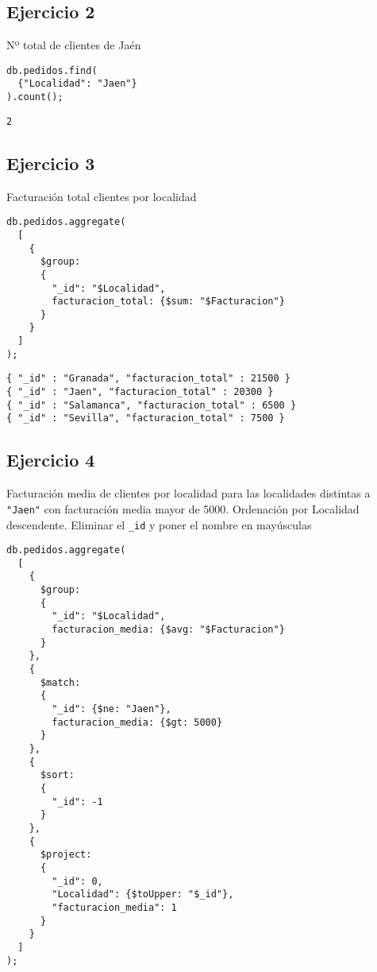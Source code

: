 \subsection{Ejercicio 2}

Nº total de clientes de Jaén

\begin{lstlisting}
db.pedidos.find(
  {"Localidad": "Jaen"}
).count();
\end{lstlisting}

\begin{lstlisting}
2
\end{lstlisting}

\subsection{Ejercicio 3}

Facturación total clientes por localidad

\begin{lstlisting}
db.pedidos.aggregate(
  [
    {
      $group: 
      {
        "_id": "$Localidad", 
        facturacion_total: {$sum: "$Facturacion"}
      }
    }
  ]
);
\end{lstlisting}

\begin{lstlisting}
{ "_id" : "Granada", "facturacion_total" : 21500 }
{ "_id" : "Jaen", "facturacion_total" : 20300 }
{ "_id" : "Salamanca", "facturacion_total" : 6500 }
{ "_id" : "Sevilla", "facturacion_total" : 7500 }
\end{lstlisting}

\subsection{Ejercicio 4}

Facturación media de clientes por localidad para las localidades distintas a \texttt{"Jaen"} con facturación media mayor de 5000. Ordenación por Localidad descendente. Eliminar el \texttt{\_id} y poner el nombre en mayúsculas

\begin{lstlisting}
db.pedidos.aggregate(
  [
    {
      $group: 
      {
        "_id": "$Localidad", 
        facturacion_media: {$avg: "$Facturacion"}
      }
    }, 
    {
      $match: 
      {
        "_id": {$ne: "Jaen"}, 
        facturacion_media: {$gt: 5000}
      }
    }, 
    {
      $sort: 
      {
        "_id": -1
      }
    },
    {
      $project:
      {
        "_id": 0,
        "Localidad": {$toUpper: "$_id"},
        "facturacion_media": 1
      }
    }
  ]
);
\end{lstlisting}

